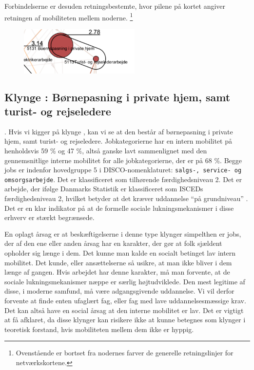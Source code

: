 Forbindelserne er desuden retningsbestemte, hvor pilene på kortet angiver retningen af mobiliteten mellem noderne.
%
\footnote{Ovenstående er bortset fra nodernes farver de generelle retningslinjer for netværkskortene.}%
%
\begin{figure}
  \vspace{-20pt}
  \begin{center}
    \includegraphics[width=6cm]{fig/segzoom/seg_2_78.pdf}
   \caption{}
   \label{fig_delanalyse1_zoom_2_78}
  \end{center}
  \vspace{-20pt}
\end{figure}
%

\subsection{Klynge : Børnepasning i private hjem, samt turist- og rejseledere}

. Hvis vi kigger på klynge , kan vi se at den består af børnepasning i private hjem, samt turist- og rejseledere. Jobkategorierne har en intern mobilitet på henholdsvis  59 \% og 47 \%, altså ganske lavt sammenlignet med den gennemsnitlige interne mobilitet for alle jobkategorierne, der er på 68 \%.  Begge jobs er indenfor hovedgruppe 5 i DISCO-nomenklaturet: \texttt{salgs-, service- og omsorgsarbejde}. Det er klassificeret som tilhørende færdighedsniveau 2. Det er arbejde, der ifølge Danmarks Statistik er klassificeret som ISCEDs færdighedsniveau 2, hvilket betyder at det kræver uddannelse “på grundniveau” \parencite[tabel 1]{DSTDISCO88}. Det er en klar indikator på at de formelle sociale lukningsmekanismer i disse erhverv er stærkt begrænsede.

En oplagt årsag er at beskæftigelserne i denne type klynger simpelthen er jobs, der af den ene eller anden årsag har en karakter, der gør at folk sjældent opholder sig længe i dem. Det kunne man kalde en socialt betinget lav intern mobilitet. Det kunde, eller ansættelserne så usikre, at man ikke bliver i dem længe af gangen. Hvis arbejdet har denne karakter, må man forvente, at de sociale lukningsmekanismer næppe er særlig højtudviklede. Den mest legitime af disse, i moderne samfund, må være adgangsgivende uddannelse. Vi vil derfor forvente at finde enten ufaglært fag, eller fag med lave uddannelsesmæssige krav. Det kan altså have en social årsag at den interne mobilitet er lav. Det er vigtigt at få afklaret, da disse klynger kan risikere ikke at kunne betegnes som klynger i teoretisk forstand, hvis mobiliteten mellem dem ikke er hyppig.  

